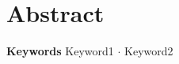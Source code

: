 
\section*{\Huge Abstract}
\vskip5mm

\lipsum[2]

\vskip1cm
\textbf{Keywords} Keyword1 $\cdot$ Keyword2 